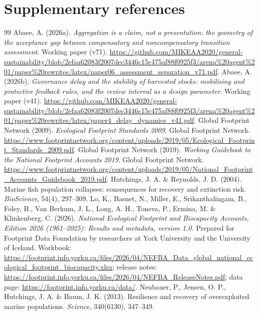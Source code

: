 \documentclass[11pt,a4paper]{article}
\begin{document}
\section*{Supplementary references}
\begin{thebibliography}{99}
\small
{} Abaee, A. (2026a). \emph{Aggregation is a claim, not a presentation: the geometry of the acceptance gap between compensatory and noncompensatory transition assessment}. Working paper (v71). \url{https://github.com/MIKEAA2020/general-sustainability/blob/2efaa62083f2007dec3446c15c475af88f0925f3/arena%20agent%201/paper%20rewrites/latex/paper06_assessment_separation_v71.pdf}.
 Abaee, A. (2026b). \emph{Governance delay and the stability of harvested stocks: mobilising and protective feedback rules, and the review interval as a design parameter}. Working paper (v41). \url{https://github.com/MIKEAA2020/general-sustainability/blob/2efaa62083f2007dec3446c15c475af88f0925f3/arena%20agent%201/paper%20rewrites/latex/paper4_delay_dynamics_v41.pdf}.
 Global Footprint Network (2009). \emph{Ecological Footprint Standards 2009}. Global Footprint Network. \url{https://www.footprintnetwork.org/content/uploads/2019/05/Ecological_Footprint_Standards_2009.pdf}.
 Global Footprint Network (2019). \emph{Working Guidebook to the National Footprint Accounts 2019}. Global Footprint Network. \url{https://www.footprintnetwork.org/content/uploads/2019/05/National_Footprint_Accounts_Guidebook_2019.pdf}.
 Hutchings, J. A. \& Reynolds, J. D. (2004). Marine fish population collapses: consequences for recovery and extinction risk. \emph{BioScience}, 54(4), 297--309.
 Lo, K., Basnet, N., Miller, E., Srikanthalingam, B., Foley, B., Van Berkum, J. L., Long, A. H., Toneva, P., Ermina, M. \& Klinkenberg, C. (2026). \emph{National Ecological Footprint and Biocapacity Accounts, Edition 2026 (1961--2025): Results and metadata, version 1.0.} Prepared for Footprint Data Foundation by researchers at York University and the University of Iceland. Workbook: \url{https://footprint.info.yorku.ca/files/2026/04/NEFBA_Data_global_national_ecological_footprint_biocapacity.xlsx}; release notes: \url{https://footprint.info.yorku.ca/files/2026/04/NEFBA_ReleaseNotes.pdf}; data page: \url{https://footprint.info.yorku.ca/data/}.
 Neubauer, P., Jensen, O. P., Hutchings, J. A. \& Baum, J. K. (2013). Resilience and recovery of overexploited marine populations. \emph{Science}, 340(6130), 347--349.

\end{thebibliography}
\end{document}
